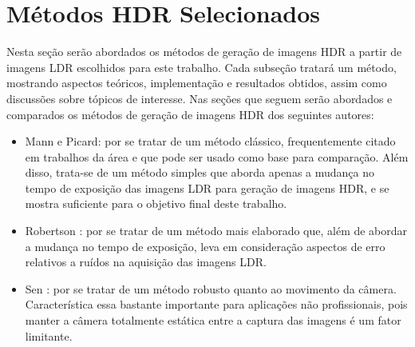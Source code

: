 \section{Métodos HDR Selecionados} \label{metodos}
Nesta seção serão abordados os métodos de geração de imagens HDR a partir de imagens LDR escolhidos para este trabalho. Cada subseção tratará um método, mostrando aspectos teóricos, implementação e resultados obtidos, assim como discussões sobre tópicos de interesse. Nas seções que seguem serão abordados e comparados os métodos de geração de imagens HDR dos seguintes autores:

\begin{itemize}
\item Mann e Picard: por se tratar de um método clássico, frequentemente citado em trabalhos da área e que pode ser usado como base para comparação. Além disso, trata-se de um método simples que aborda apenas a mudança no tempo de exposição das imagens LDR para geração de imagens HDR, e se mostra suficiente para o objetivo final deste trabalho.
\item Robertson \etal: por se tratar de um método mais elaborado que, além de abordar a mudança no tempo de exposição, leva em consideração aspectos de erro relativos a ruídos na aquisição das imagens LDR. 
\item Sen \etal: por se tratar de um método robusto quanto ao movimento da câmera. Característica essa bastante importante para aplicações não profissionais, pois manter a câmera totalmente estática entre a captura das imagens é um fator limitante.
\end{itemize}

